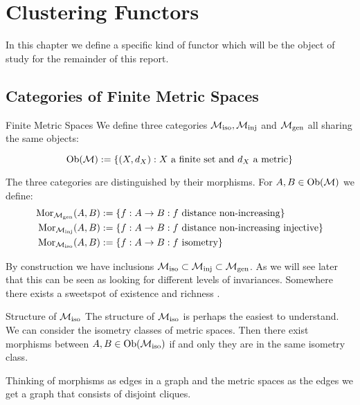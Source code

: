 \chapter{Clustering Functors}
\label{chapter__clustering_functor}


In this chapter we define a specific kind of functor which will be the object of study for the remainder of this report.



\section{Categories of Finite Metric Spaces}

\begin{definition}{Finite Metric Spaces}{}
We define three categories ${\mathcal{M}_\mathrm{iso}}, {\mathcal{M}_\mathrm{inj}}$ and ${\mathcal{M}_\mathrm{gen}}$ all sharing the same objects:

\begin{equation*}
\mathrm {Ob}(\mathcal{M}) := \{(X,d_X): \text{$X$ a finite set and $d_X$ a metric}\}
\end{equation*}

The three categories are distinguished by their morphisms. For $A, B \in \mathrm {Ob}(\mathcal{M})$ we define:
\begin{align*}
\mathrm {Mor}_{\mathcal{M}_\mathrm{gen}}(A,B) &:= \{f: A \to B: \text{$f$ distance non-increasing}\} \\
\mathrm {Mor}_{\mathcal{M}_\mathrm{inj}}(A,B) &:= \{f: A \to B: \text{$f$ distance non-increasing injective}\} \\
\mathrm {Mor}_{\mathcal{M}_\mathrm{iso}}(A,B) &:= \{f: A \to B: \text{$f$ isometry}\} \\
\end{align*}

\end{definition}


By construction we have inclusions ${\mathcal{M}_\mathrm{iso}} \subset {\mathcal{M}_\mathrm{inj}} \subset {\mathcal{M}_\mathrm{gen}}$. As we will see later that this can be seen as looking for different levels of invariances. Somewhere there exists a sweetspot of existence and richness .


\begin{myremark}{Structure of ${\mathcal{M}_\mathrm{iso}}$}{}
The structure of ${\mathcal{M}_\mathrm{iso}}$ is perhaps the easiest to understand. We can consider the isometry classes of metric spaces. Then there exist morphisms between $A, B \in \mathrm {Ob}({\mathcal{M}_\mathrm{iso}})$ if and only they are in the same isometry class.

Thinking of morphisms as edges in a graph and the metric spaces as the edges we get a graph that consists of disjoint cliques.

\end{myremark}

